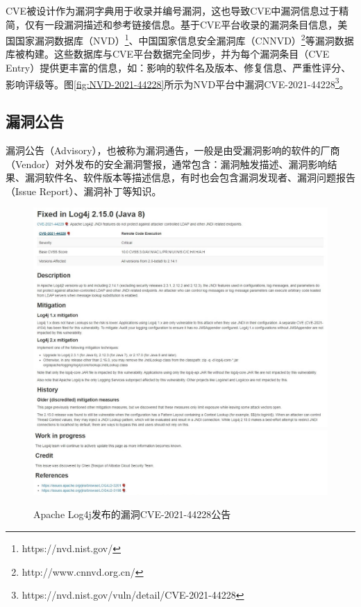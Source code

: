 CVE被设计作为漏洞字典用于收录并编号漏洞，这也导致CVE中漏洞信息过于精简，仅有一段漏洞描述和参考链接信息。基于CVE平台收录的漏洞条目信息，美国国家漏洞数据库（NVD）\footnote{https://nvd.nist.gov/}、中国国家信息安全漏洞库（CNNVD）\footnote{http://www.cnnvd.org.cn/}等漏洞数据库被构建。这些数据库与CVE平台数据完全同步，并为每个漏洞条目（CVE Entry）提供更丰富的信息，如：影响的软件名及版本、修复信息、严重性评分、影响评级等。图\ref{fig:NVD-2021-44228}所示为NVD平台中漏洞CVE-2021-44228\footnote{https://nvd.nist.gov/vuln/detail/CVE-2021-44228}。




\subsection{漏洞公告} 
漏洞公告（Advisory），也被称为漏洞通告，一般是由受漏洞影响的软件的厂商（Vendor）对外发布的安全漏洞警报，通常包含：漏洞触发描述、漏洞影响结果、漏洞软件名、软件版本等描述信息，有时也会包含漏洞发现者、漏洞问题报告（Issue Report）、漏洞补丁等知识。

\begin{figure}[!t]
    \centering
    \includegraphics[width=1.0\textwidth]{fig/Vendor-2021-44228}
    \includegraphics[width=1.0\textwidth]{fig/Vendor-2021-44228-2}
    \caption{Apache Log4j发布的漏洞CVE-2021-44228公告}
    \label{fig:Vendor-2021-44228}
\end{figure}

